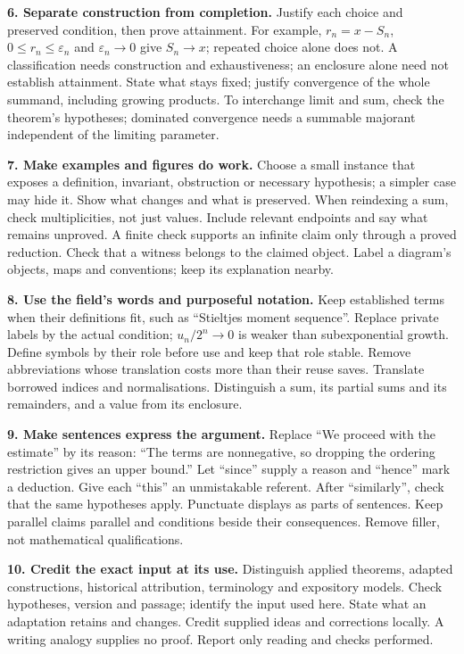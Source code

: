 \documentclass[10pt]{article}
\newcommand{\instruction}[2]{\par\medskip\noindent\textbf{#1.} #2\par}
\begin{document}
\instruction{6. Separate construction from completion}{
Justify each choice and preserved condition, then prove attainment.
For example, $r_n=x-S_n$, $0\le r_n\le\varepsilon_n$ and
$\varepsilon_n\to0$ give $S_n\to x$; repeated choice alone does not.
A classification needs construction and exhaustiveness; an enclosure alone
need not establish attainment. State what stays fixed; justify convergence of
the whole summand, including growing products. To interchange limit and sum,
check the theorem's hypotheses; dominated convergence needs a summable majorant
independent of the limiting parameter.}

\newpage\enlargethispage{3\baselineskip}
\instruction{7. Make examples and figures do work}{
Choose a small instance that exposes a definition, invariant, obstruction or
necessary hypothesis; a simpler case may hide it. Show what changes and what
is preserved. When reindexing a sum, check multiplicities, not just values.
Include relevant endpoints and say what remains unproved. A finite check
supports an infinite claim only through a proved reduction. Check that a
witness belongs to the claimed object. Label a diagram's objects, maps and
conventions; keep its explanation nearby.}

\instruction{8. Use the field's words and purposeful notation}{
Keep established terms when their definitions fit, such as ``Stieltjes moment
sequence''. Replace private labels by the actual condition; $u_n/2^n\to0$
is weaker than subexponential growth. Define symbols by their role before use
and keep that role stable. Remove abbreviations whose translation costs more
than their reuse saves. Translate borrowed indices and normalisations.
Distinguish a sum, its partial sums and its remainders, and a value from its enclosure.}

\instruction{9. Make sentences express the argument}{
Replace ``We proceed with the estimate'' by its reason: ``The terms are
nonnegative, so dropping the ordering restriction gives an upper bound.'' Let ``since'' supply a reason
and ``hence'' mark a deduction. Give each ``this'' an unmistakable referent.
After ``similarly'', check that the same hypotheses apply. Punctuate displays
as parts of sentences. Keep parallel claims parallel and conditions beside
their consequences. Remove filler, not mathematical qualifications.}

\instruction{10. Credit the exact input at its use}{
Distinguish applied theorems, adapted constructions, historical attribution,
terminology and expository models. Check hypotheses, version
and passage; identify the input used here. State what an adaptation retains and
changes. Credit supplied ideas and corrections locally. A writing analogy
supplies no proof. Report only reading and checks performed.}
\end{document}

